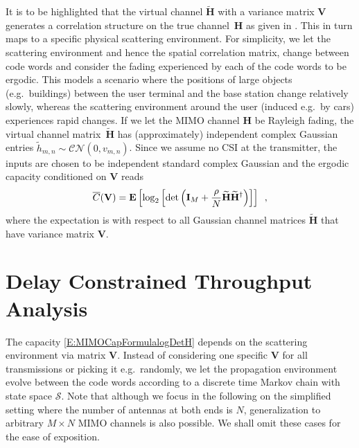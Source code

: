 \documentclass[10pt,conference]{IEEEtran}
\newcommand{\Ex}{\mathop{\bf E\/}}
\begin{document}
It is to be highlighted that the virtual channel $\widetilde{ \mathbf{H} } $ with a variance matrix $\mathbf{V}$ generates a correlation structure on the true  channel~$\mathbf{H}$ as given in \cite[Eq.~(9)]{Raghavan:2010:WKM}.  This in turn maps to a specific physical scattering environment.
For simplicity, we let the scattering environment and hence the spatial correlation matrix, change between code words and consider the fading experienced by each of the code words to be ergodic.  This models a scenario where the positions of large objects (e.g.\ buildings) between the user terminal and the base station change relatively slowly, whereas the scattering environment around the user (induced e.g.\ by cars)  experiences rapid changes.
If we let the MIMO channel $\mathbf{H}$ be Rayleigh fading, the virtual channel matrix~$\mathbf{ \widetilde{H} }$ has (approximately) independent complex Gaussian entries $\widetilde{h}_{m,n} \sim \mathcal{CN}(0,v_{m,n})$.  Since we assume no CSI at the transmitter, the inputs are chosen to be independent standard complex Gaussian and the ergodic capacity conditioned on $\mathbf{V}$ reads \cite{MIMO:Veeravalli2005:CorrelatedMIMO:Variance}
\begin{equation}
	\label{E:MIMOCapFormulalogDetH}
\overline{C}(\mathbf{V}) =  \Ex \left[ \log_{2} \left [\mathrm{det} \left ( \mathbf{I}_M + \frac {\rho}{N} \mathbf{\widetilde{H}\widetilde{H}^{\dag}}   \right )     \right ] \right ] \enspace,
\end{equation}
where the expectation is with respect to all Gaussian channel matrices $\widetilde{\mathbf{H}}$ that have variance matrix $\mathbf{V}$.




\section{Delay Constrained Throughput Analysis}
    \label{Sec:DelayConstrainedThAnalysis}
The capacity \eqref{E:MIMOCapFormulalogDetH} depends on the scattering environment via matrix $\mathbf{V}$.  Instead of considering one specific $\mathbf{V}$ for all transmissions or picking it e.g.\ randomly, we let the propagation environment evolve between the code words according to a discrete time Markov chain with state space $\mathcal{S}$.  Note that although we focus in the following on the simplified setting where the number of antennas at both ends is $N$, generalization to arbitrary $M \times N$ MIMO channels is also possible. We shall omit these cases for the ease of exposition.
\end{document}
